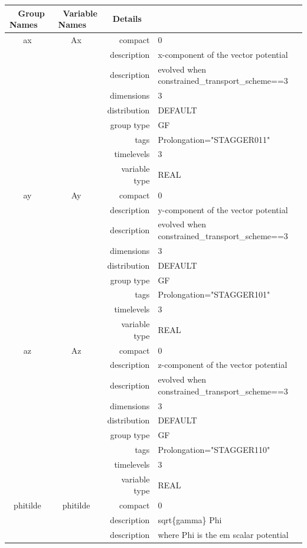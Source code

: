 \documentclass{article}
\begin{document}
\begin{tabular*}{150mm}{|c|c@{\extracolsep{\fill}}|rl|} \hline 
~ {\bf Group Names} ~ & ~ {\bf Variable Names} ~  &{\bf Details} ~ & ~ \\ 
\hline 
ax & Ax & compact & 0 \\ 
 &  & description & x-component of the vector potential \\ 
& ~ & description &  evolved when constrained\_transport\_scheme==3 \\ 
 &  & dimensions & 3 \\ 
 &  & distribution & DEFAULT \\ 
 &  & group type & GF \\ 
 &  & tags & Prolongation="STAGGER011" \\ 
 &  & timelevels & 3 \\ 
 &  & variable type & REAL \\ 
\hline 
ay & Ay & compact & 0 \\ 
 &  & description & y-component of the vector potential \\ 
& ~ & description &  evolved when constrained\_transport\_scheme==3 \\ 
 &  & dimensions & 3 \\ 
 &  & distribution & DEFAULT \\ 
 &  & group type & GF \\ 
 &  & tags & Prolongation="STAGGER101" \\ 
 &  & timelevels & 3 \\ 
 &  & variable type & REAL \\ 
\hline 
az & Az & compact & 0 \\ 
 &  & description & z-component of the vector potential \\ 
& ~ & description &  evolved when constrained\_transport\_scheme==3 \\ 
 &  & dimensions & 3 \\ 
 &  & distribution & DEFAULT \\ 
 &  & group type & GF \\ 
 &  & tags & Prolongation="STAGGER110" \\ 
 &  & timelevels & 3 \\ 
 &  & variable type & REAL \\ 
\hline 
phitilde & phitilde & compact & 0 \\ 
 &  & description & sqrt\{gamma\} Phi \\ 
& ~ & description &  where Phi is the em scalar potential \\ 

\end{tabular*}
\end{document}
